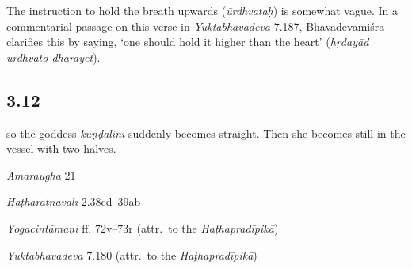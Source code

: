 \begin{ekdosis}
\begin{philcomm}[hp03_011]
The instruction to hold the breath upwards (\emph{ūrdhvataḥ}) is somewhat vague. In a commentarial passage on this verse in \emph{Yuktabhavadeva} 7.187, Bhavadevamiśra clarifies this by saying, `one should hold it higher than the heart' (\emph{hṛdayād ūrdhvato dhārayet}).
\end{philcomm}

\subsection*{3.12}
\begin{translation}[hp03_012]
[\dots] so the goddess \emph{kuṇḍalinī} suddenly becomes straight. Then she becomes still in the vessel with two halves.
\end{translation}

\begin{sources}[hp03_012]
\emph{Amaraugha} 21
\begin{versinnote}
\end{versinnote}
\end{sources}

\begin{testimonia}[hp03_012]
\emph{Haṭharatnāvalī} 2.38cd–39ab
\begin{versinnote}
\end{versinnote}

\emph{Yogacintāmaṇi} ff. 72v–73r (attr.~to the \emph{Haṭhapradīpikā}) %
\begin{versinnote}
\tl{dvipuṭā ] em., dvipaṭā° L, dvipadā° N. \\!}
\end{versinnote}

\emph{Yuktabhavadeva} 7.180 (attr.~to the \emph{Haṭhapradīpikā})
\begin{versinnote}
\end{versinnote}
\end{testimonia}


\end{ekdosis}
